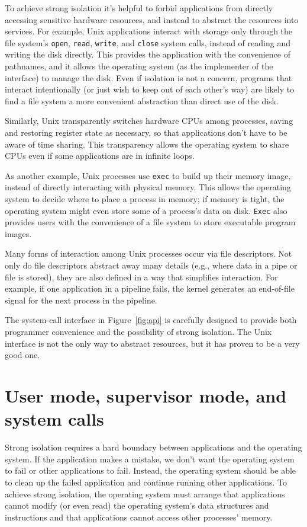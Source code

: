 To achieve strong isolation it's helpful to forbid applications from
directly accessing sensitive hardware resources, and instead to abstract the
resources into services.  For example, Unix applications interact with storage
only through the file system's
\lstinline{open},
\lstinline{read},
\lstinline{write}, 
and
\lstinline{close}
system calls,
instead of reading and writing the disk directly. 
This provides the application with the convenience of pathnames, and it allows
the operating system (as the implementer of the interface) to manage the disk. 
Even if isolation is not a concern,
programs that interact intentionally (or just wish to keep
out of each other's way) are likely to find a file system a more convenient
abstraction than direct use of the disk.

Similarly, Unix transparently switches hardware CPUs among processes,
saving and restoring register state as necessary,
so that applications don't have to be
aware of time sharing.  This transparency allows the operating system to share
CPUs even if some applications are in infinite loops.

As another example, Unix processes use 
\lstinline{exec}
to build up their memory image, instead of directly interacting with physical
memory.  This allows the operating system to decide where to place a process in
memory; if memory is tight, the operating system might even store some of
a process's data on disk.
\lstinline{Exec}
also provides
users with the convenience of a file system to store executable program images.  

Many forms of interaction among Unix processes occur via file descriptors.
Not only do file descriptors abstract away many details (e.g.,
where data in a pipe or file is stored), they are also defined in a
way that simplifies interaction.
For example, if one application in a pipeline fails, the kernel
generates an end-of-file signal for the next process in the pipeline.

The system-call interface in
Figure~\ref{fig:api}
is carefully designed to provide both programmer convenience and
the possibility of strong isolation.  The Unix interface
is not the only way to abstract resources, but it has proven to be a very good
one.

\section{User mode, supervisor mode, and system calls}

Strong isolation requires a hard boundary between applications and the operating
system.  If the application makes a mistake, we don't want the operating system
to fail or other applications to fail. Instead, the operating system should be
able to clean up the failed application and continue running other applications.
To achieve strong isolation, the operating system must arrange that applications cannot modify (or even
read) the operating system's data structures and instructions and that
applications cannot access other processes' memory.

